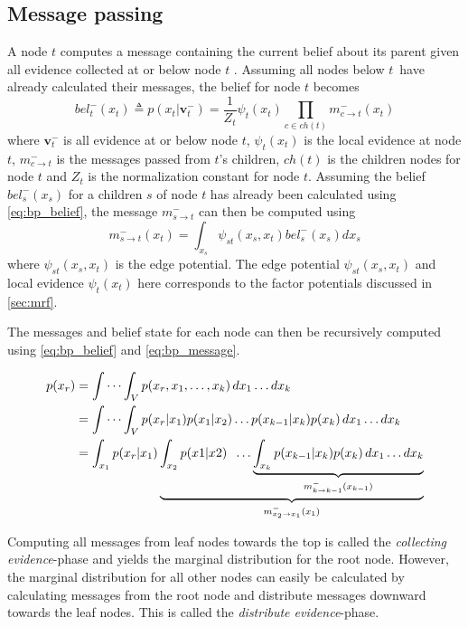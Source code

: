 \subsection{Message passing}
A node $t$ computes a message containing the current belief about its parent given all evidence collected at or below node $t$ \cite{murphy}. Assuming all nodes below $t$ have already calculated their messages, the belief for node $t$ becomes
\begin{equation}\label{eq:bp_belief}
    bel_t^-(x_t) \triangleq p(x_t | \mathbf{v}_t^-) = \frac{1}{Z_t}\psi_t(x_t) \prod_{c \in ch(t)} m_{c\to t}^-(x_t)
\end{equation}
where $\mathbf{v}_t^-$ is all evidence at or below node $t$, $\psi_t(x_t)$ is the local evidence at node $t$, $m_{c \to t}^-$ is the messages passed from $t$'s children, $ch(t)$ is the children nodes for node $t$ and $Z_t$ is the normalization constant for node $t$.
Assuming the belief $bel_s^-(x_s)$ for a children $s$ of node $t$ has already been calculated using \cref{eq:bp_belief},  the message $m_{s\to t}^-$ can then be computed using
\begin{equation}\label{eq:bp_message}
    m_{s \to t}^-(x_t) = \int_{x_s} \psi_{st}(x_s, x_t) bel_s^-(x_s) dx_s
\end{equation}
where $\psi_{st}(x_s, x_t)$ is the edge potential. The edge potential $\psi_{st}(x_s, x_t)$ and local evidence $\psi_t(x_t)$ here corresponds to the factor potentials discussed in \cref{sec:mrf}.

The messages and belief state for each node can then be recursively computed using \cref{eq:bp_belief} and \cref{eq:bp_message}.

\begin{subequations}
\begin{align}
p(x_r) &= \idotsint_V p(x_r, x_1,\dots,x_k) \,dx_1 \dots dx_k\\
&= \idotsint_V p(x_r | x_1)p(x_1|x_2)\dots p(x_{k-1} | x_k)p(x_k) \, dx_1 \dots dx_k\\
&= \int_{x_1} p(x_r | x_1)\underbrace{\int_{x_2}p(x1 | x2) \; \;  \dots \underbrace{\int_{x_k} p(x_{k-1} | x_k)p(x_k) \, dx_1 \dots dx_k}_{m_{k\to k-1}^-(x_{k-1})}}_{m_{x_2 \to x_1}^-(x_1)}
\end{align}
\end{subequations}

Computing all messages from leaf nodes towards the top is called the \textit{collecting evidence}-phase and yields the marginal distribution for the root node. However, the marginal distribution for all other nodes can easily be calculated by calculating messages from the root node and distribute messages downward towards the leaf nodes. This is called the \textit{distribute evidence}-phase. 

